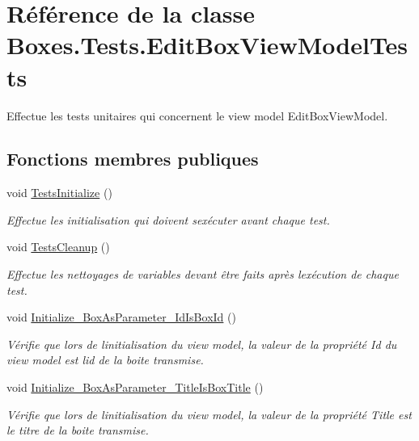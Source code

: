 \hypertarget{class_boxes_1_1_tests_1_1_edit_box_view_model_tests}{}\section{Référence de la classe Boxes.\+Tests.\+Edit\+Box\+View\+Model\+Tests}
\label{class_boxes_1_1_tests_1_1_edit_box_view_model_tests}


Effectue les tests unitaires qui concernent le view model Edit\+Box\+View\+Model.  


\subsection*{Fonctions membres publiques}
\begin{DoxyCompactItemize}
\item 
void \hyperlink{class_boxes_1_1_tests_1_1_edit_box_view_model_tests_a31bd8b9e46301a9d48b822cbc2732735}{Tests\+Initialize} ()
\begin{DoxyCompactList}\small\item\em Effectue les initialisation qui doivent s\textquotesingle{}exécuter avant chaque test. \end{DoxyCompactList}\item 
void \hyperlink{class_boxes_1_1_tests_1_1_edit_box_view_model_tests_ae0e1c616388bf76e68afbd168903ed89}{Tests\+Cleanup} ()
\begin{DoxyCompactList}\small\item\em Effectue les nettoyages de variables devant être faits après l\textquotesingle{}exécution de chaque test. \end{DoxyCompactList}\item 
void \hyperlink{class_boxes_1_1_tests_1_1_edit_box_view_model_tests_ab1ef86cd72ccc98bc605b62172a77d1e}{Initialize\+\_\+\+Box\+As\+Parameter\+\_\+\+Id\+Is\+Box\+Id} ()
\begin{DoxyCompactList}\small\item\em Vérifie que lors de l\textquotesingle{}initialisation du view model, la valeur de la propriété {\ttfamily Id} du view model est l\textquotesingle{}id de la boite transmise. \end{DoxyCompactList}\item 
void \hyperlink{class_boxes_1_1_tests_1_1_edit_box_view_model_tests_a03aed72c365f6d60774883c55c0fb716}{Initialize\+\_\+\+Box\+As\+Parameter\+\_\+\+Title\+Is\+Box\+Title} ()
\begin{DoxyCompactList}\small\item\em Vérifie que lors de l\textquotesingle{}initialisation du view model, la valeur de la propriété {\ttfamily Title} est le titre de la boite transmise. \end{DoxyCompactList}\item 

\end{DoxyCompactItemize}
